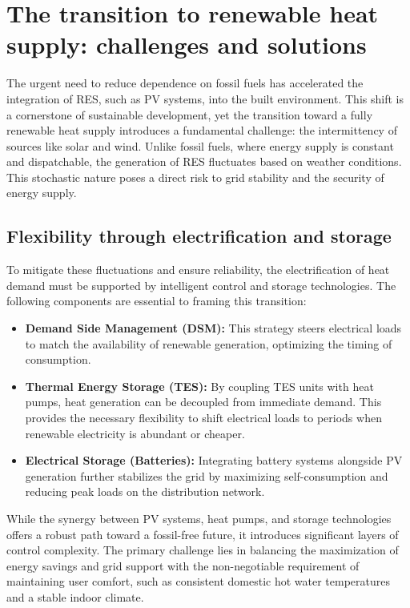 \documentclass[11pt,a4paper]{report}
\begin{document}
\section{The transition to renewable heat supply: challenges and solutions}

The urgent need to reduce dependence on fossil fuels has accelerated the integration of RES, such as PV systems, into the built environment.
This shift is a cornerstone of sustainable development, yet the transition toward a fully renewable heat supply introduces a fundamental challenge: the intermittency of sources like solar and wind.
Unlike fossil fuels, where energy supply is constant and dispatchable, the generation of RES fluctuates based on weather conditions.
This stochastic nature poses a direct risk to grid stability and the security of energy supply.

\subsection{Flexibility through electrification and storage}
To mitigate these fluctuations and ensure reliability, the electrification of heat demand must be supported by intelligent control and storage technologies.
The following components are essential to framing this transition:

\begin{itemize}
    \item \textbf{Demand Side Management (DSM):} 
        This strategy steers electrical loads to match the availability of renewable generation, optimizing the timing of consumption.
            \item \textbf{Thermal Energy Storage (TES):} 
                By coupling TES units with heat pumps, heat generation can be decoupled from immediate demand. 
                    This provides the necessary flexibility to shift electrical loads to periods when renewable electricity is abundant or cheaper.
                        \item \textbf{Electrical Storage (Batteries):} 
                            Integrating battery systems alongside PV generation further stabilizes the grid by maximizing self-consumption and reducing peak loads on the distribution network.
                            \end{itemize}
                            
                            
                            
                            While the synergy between PV systems, heat pumps, and storage technologies offers a robust path toward a fossil-free future, it introduces significant layers of control complexity.
                            The primary challenge lies in balancing the maximization of energy savings and grid support with the non-negotiable requirement of maintaining user comfort, such as consistent domestic hot water temperatures and a stable indoor climate.
                            
\end{document}
